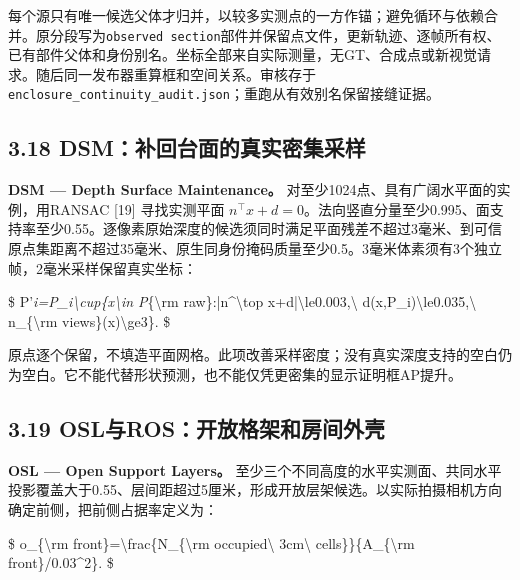 \documentclass[UTF8,fontset=fandol]{ctexart}
\begin{document}
每个源只有唯一候选父体才归并，以较多实测点的一方作锚；避免循环与依赖合并。原分段写为\texttt{observed section}部件并保留点文件，更新轨迹、逐帧所有权、已有部件父体和身份别名。坐标全部来自实际测量，无GT、合成点或新视觉请求。随后同一发布器重算框和空间关系。审核存于\texttt{enclosure\_\allowbreak{}continuity\_\allowbreak{}audit.\allowbreak{}json}；重跑从有效别名保留接缝证据。



\subsection*{3.18 DSM：补回台面的真实密集采样}

\textbf{DSM — Depth Surface Maintenance。} 对至少1024点、具有广阔水平面的实例，用RANSAC [19] 寻找实测平面 $n^\top x+d=0$。法向竖直分量至少0.995、面支持率至少0.55。逐像素原始深度的候选须同时满足平面残差不超过3毫米、到可信原点集距离不超过35毫米、原生同身份掩码质量至少0.5。3毫米体素须有3个独立帧，2毫米采样保留真实坐标：



\$
P'\emph{i=P\_i\textbackslash{}cup\{x\textbackslash{}in P}\{\textbackslash{}rm raw\}:|n\textasciicircum{}\textbackslash{}top x+d|\textbackslash{}le0.003,\textbackslash{} d(x,P\_i)\textbackslash{}le0.035,\textbackslash{} n\_\{\textbackslash{}rm views\}(x)\textbackslash{}ge3\}.
\$



原点逐个保留，不填造平面网格。此项改善采样密度；没有真实深度支持的空白仍为空白。它不能代替形状预测，也不能仅凭更密集的显示证明框AP提升。



\subsection*{3.19 OSL与ROS：开放格架和房间外壳}

\textbf{OSL — Open Support Layers。} 至少三个不同高度的水平实测面、共同水平投影覆盖大于0.55、层间距超过5厘米，形成开放层架候选。以实际拍摄相机方向确定前侧，把前侧占据率定义为：



\$
o\_\{\textbackslash{}rm front\}=\textbackslash{}frac\{N\_\{\textbackslash{}rm occupied\textbackslash{} 3cm\textbackslash{} cells\}\}\{A\_\{\textbackslash{}rm front\}/0.03\textasciicircum{}2\}.
\$
\end{document}
